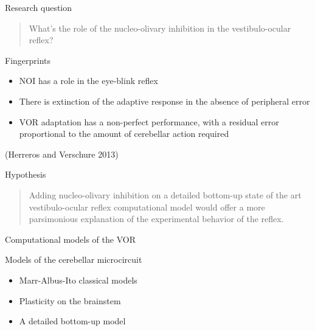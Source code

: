 \documentclass[ignorenonframetext,]{beamer}
\begin{document}
\begin{frame}{Research question}

\begin{quote}
What's the role of the nucleo-olivary inhibition in the vestibulo-ocular
reflex?
\end{quote}

\begin{block}{Fingerprints}

\begin{itemize}
\itemsep1pt\parskip0pt
\item
  NOI has a role in the eye-blink reflex
\item
  There is extinction of the adaptive response in the absence of
  peripheral error
\item
  VOR adaptation has a non-perfect performance, with a residual error
  proportional to the amount of cerebellar action required
\end{itemize}

(Herreros and Verschure 2013)

\end{block}

\end{frame}

\begin{frame}{Hypothesis}

\begin{quote}
Adding nucleo-olivary inhibition on a detailed bottom-up state of the
art vestibulo-ocular reflex computational model would offer a more
parsimonious explanation of the experimental behavior of the reflex.
\end{quote}

\end{frame}

\begin{frame}{Computational models of the VOR}

Models of the cerebellar microcircuit

\begin{itemize}
\itemsep1pt\parskip0pt
\item
  Marr-Albus-Ito classical models
\item
  Plasticity on the brainstem
\item
  A detailed bottom-up model
\end{itemize}

\end{frame}
\end{document}
